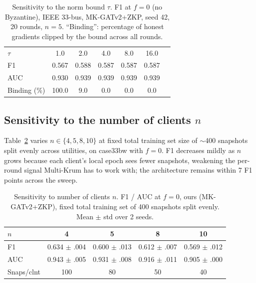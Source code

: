 \documentclass[conference]{IEEEtran}
\begin{document}
\begin{table}[t]
\centering
\caption{Sensitivity to the norm bound $\tau$. F1 at $f=0$ (no Byzantine), IEEE 33-bus, MK-GATv2+ZKP, seed 42, 20 rounds, $n=5$. ``Binding'': percentage of honest gradients clipped by the bound across all rounds.}
\label{tab:tau-sens}
\renewcommand{\arraystretch}{1.05}
\begin{tabular}{lcccccc}
\toprule
$\tau$               & 1.0   & 2.0   & 4.0   & 8.0   & 16.0  \\
F1                   & 0.567 & 0.588 & 0.587 & 0.587 & 0.587 \\
AUC                  & 0.930 & 0.939 & 0.939 & 0.939 & 0.939 \\
Binding (\%)         & 100.0 & 9.0   & 0.0   & 0.0   & 0.0   \\
\bottomrule
\end{tabular}
\end{table}

\subsection{Sensitivity to the number of clients $n$}
\label{sec:eval-n}
Table~\ref{tab:n-sens} varies $n \in \{4,5,8,10\}$ at fixed total training set size of $\sim$400 snapshots split evenly across utilities, on case33bw with $f=0$. F1 decreases mildly as $n$ grows because each client's local epoch sees fewer snapshots, weakening the per-round signal Multi-Krum has to work with; the architecture remains within 7 F1 points across the sweep.

\begin{table}[t]
\centering
\caption{Sensitivity to number of clients $n$. F1 / AUC at $f=0$, ours (MK-GATv2+ZKP), fixed total training set of 400 snapshots split evenly. Mean $\pm$ std over 2 seeds.}
\label{tab:n-sens}
\renewcommand{\arraystretch}{1.05}
\setlength{\tabcolsep}{4pt}
\begin{tabular}{lcccc}
\toprule
$n$         & 4 & 5 & 8 & 10 \\
\midrule
F1          & 0.634 $\pm$ .004 & 0.600 $\pm$ .013 & 0.612 $\pm$ .007 & 0.569 $\pm$ .012 \\
AUC         & 0.943 $\pm$ .005 & 0.931 $\pm$ .008 & 0.916 $\pm$ .011 & 0.905 $\pm$ .000 \\
Snaps/clnt  & 100 & 80 & 50 & 40 \\
\bottomrule
\end{tabular}
\end{table}
\end{document}
